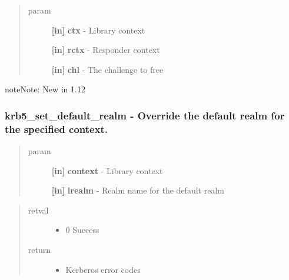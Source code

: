 \documentclass[letterpaper,10pt,english]{sphinxmanual}
\begin{document}
\begin{quote}\begin{description}
\item[{param}] \leavevmode
\textbf{{[}in{]}} \textbf{ctx} - Library context

\textbf{{[}in{]}} \textbf{rctx} - Responder context

\textbf{{[}in{]}} \textbf{chl} - The challenge to free

\end{description}\end{quote}

\begin{notice}{note}{Note:}
New in 1.12
\end{notice}


\subsubsection{krb5\_set\_default\_realm -  Override the default realm for the specified context.}
\label{appdev/refs/api/krb5_set_default_realm::doc}\label{appdev/refs/api/krb5_set_default_realm:krb5-set-default-realm-override-the-default-realm-for-the-specified-context}

\begin{fulllineitems}
\label{appdev/refs/api/krb5_set_default_realm:c.krb5_set_default_realm}
\end{fulllineitems}

\begin{quote}\begin{description}
\item[{param}] \leavevmode
\textbf{{[}in{]}} \textbf{context} - Library context

\textbf{{[}in{]}} \textbf{lrealm} - Realm name for the default realm

\end{description}\end{quote}
\begin{quote}\begin{description}
\item[{retval}] \leavevmode\begin{itemize}
\item {} 
0   Success

\end{itemize}

\item[{return}] \leavevmode\begin{itemize}
\item {} 
Kerberos error codes

\end{itemize}

\end{description}\end{quote}
\end{document}
